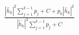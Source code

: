 \documentclass[preview]{standalone}
\begin{document}
\begin{align*}
\frac{\left|{\hat{h}_k}\right|^2\sum_{j=1}^{k-1}p_j+ C + p_k\left|{\hat{h}_k}\right|^2}{\left|{\hat{h}_k}\right|^2\sum_{j=1}^{k-1}p_j+ C}
\end{align*}
\end{document}
